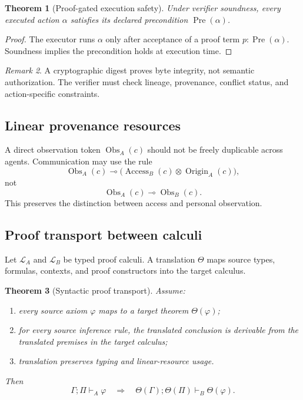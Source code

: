 \documentclass[11pt]{article}
\newtheorem{theorem}{Theorem}[section]
\theoremstyle{definition}
\theoremstyle{remark}
\newtheorem{remark}[theorem]{Remark}
\newcommand{\Access}{\operatorname{Access}}
\newcommand{\Origin}{\operatorname{Origin}}
\newcommand{\Obs}{\operatorname{Obs}}
\begin{document}
\begin{theorem}[Proof-gated execution safety]
Under verifier soundness, every executed action \(\alpha\) satisfies its declared precondition \(\operatorname{Pre}(\alpha)\).
\end{theorem}

\begin{proof}
The executor runs \(\alpha\) only after acceptance of a proof term \(p:\operatorname{Pre}(\alpha)\). Soundness implies the precondition holds at execution time.
\end{proof}

\begin{remark}
A cryptographic digest proves byte integrity, not semantic authorization. The verifier must check lineage, provenance, conflict status, and action-specific constraints.
\end{remark}

\subsection{Linear provenance resources}

A direct observation token \(\Obs_A(c)\) should not be freely duplicable across agents. Communication may use the rule
\[
\Obs_A(c)
\multimap
\bigl(
\Access_B(c)
\otimes
\Origin_A(c)
\bigr),
\]
not
\[
\Obs_A(c)\multimap\Obs_B(c).
\]
This preserves the distinction between access and personal observation.

\subsection{Proof transport between calculi}

Let \(\mathcal L_A\) and \(\mathcal L_B\) be typed proof calculi. A translation \(\Theta\) maps source types, formulas, contexts, and proof constructors into the target calculus.

\begin{theorem}[Syntactic proof transport]
Assume:
\begin{enumerate}[leftmargin=1.7em]
  \item every source axiom \(\varphi\) maps to a target theorem \(\Theta(\varphi)\);
  \item for every source inference rule, the translated conclusion is derivable from the translated premises in the target calculus;
  \item translation preserves typing and linear-resource usage.
\end{enumerate}
Then
\[
\Gamma;\Pi\vdash_A\varphi
\quad\Longrightarrow\quad
\Theta(\Gamma);\Theta(\Pi)\vdash_B\Theta(\varphi).
\]
\end{theorem}
\end{document}
